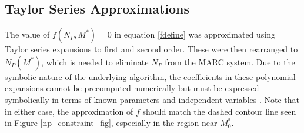 \documentclass{ansconf}
\begin{document}
\subsection{Taylor Series Approximations}
\label{sec:aproxmeth}

The value of $f(N_P,M^*)=0$ in equation \ref{fdefine} was approximated using 
Taylor series expansions to first and second order.  These were then rearranged to 
$N_P(M^*)$, which is needed to eliminate $N_P$ from the MARC system.  
Due to the symbolic nature of the underlying algorithm, the coefficients in these
polynomial expansions cannot be precomputed numerically but must be 
expressed symbolically in terms of known parameters and independent variables 
\cite{Sacks:1989:ASS:1623755.1623823}.
Note that in 
either case, the approximation of $f$ should match the dashed contour line seen in 
Figure \ref{np_constraint_fig}, especially in the region near $M_0^*$.
\end{document}
